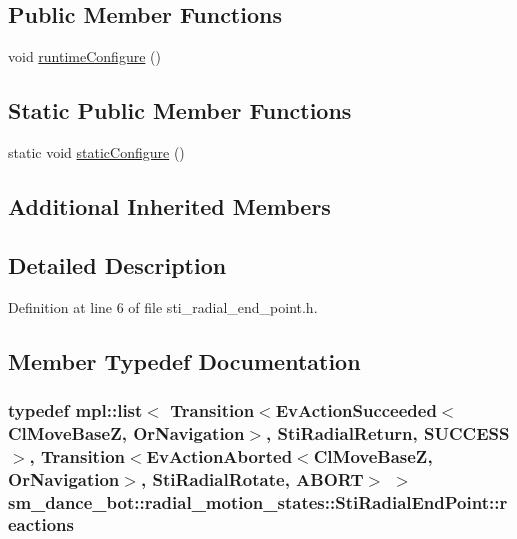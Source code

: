 \subsection*{Public Member Functions}
\begin{DoxyCompactItemize}
\item 
void \hyperlink{structsm__dance__bot_1_1radial__motion__states_1_1StiRadialEndPoint_a20e04d54177f8cd54afb302f52abc3ea}{runtime\+Configure} ()
\end{DoxyCompactItemize}
\subsection*{Static Public Member Functions}
\begin{DoxyCompactItemize}
\item 
static void \hyperlink{structsm__dance__bot_1_1radial__motion__states_1_1StiRadialEndPoint_af56148eff4ec21f9650db2b62ead169d}{static\+Configure} ()
\end{DoxyCompactItemize}
\subsection*{Additional Inherited Members}


\subsection{Detailed Description}


Definition at line 6 of file sti\+\_\+radial\+\_\+end\+\_\+point.\+h.



\subsection{Member Typedef Documentation}
\subsubsection[{\texorpdfstring{reactions}{reactions}}]{\setlength{\rightskip}{0pt plus 5cm}typedef mpl\+::list$<$ Transition$<$Ev\+Action\+Succeeded$<${\bf Cl\+Move\+BaseZ}, {\bf Or\+Navigation}$>$, {\bf Sti\+Radial\+Return}, {\bf S\+U\+C\+C\+E\+SS}$>$, Transition$<$Ev\+Action\+Aborted$<${\bf Cl\+Move\+BaseZ}, {\bf Or\+Navigation}$>$, {\bf Sti\+Radial\+Rotate}, A\+B\+O\+RT$>$ $>$ {\bf sm\+\_\+dance\+\_\+bot\+::radial\+\_\+motion\+\_\+states\+::\+Sti\+Radial\+End\+Point\+::reactions}}\hypertarget{structsm__dance__bot_1_1radial__motion__states_1_1StiRadialEndPoint_aa4d950f02eb10e76a1f6166863d3ee9e}{}\label{structsm__dance__bot_1_1radial__motion__states_1_1StiRadialEndPoint_aa4d950f02eb10e76a1f6166863d3ee9e}


